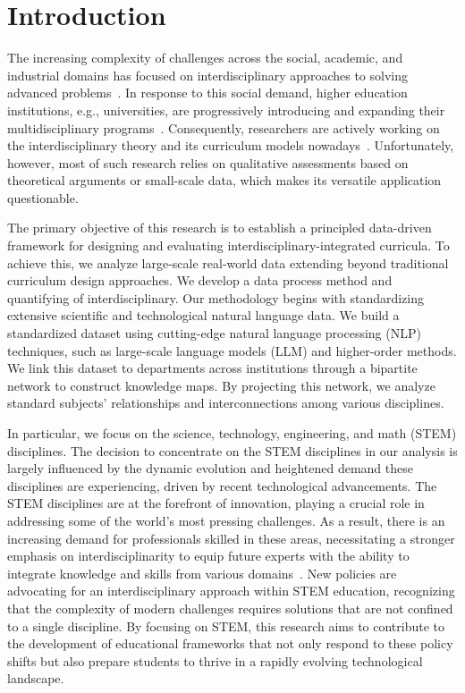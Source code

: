 \documentclass{bmcart}
\begin{document}
\section{Introduction}
\label{sec:intro}

The increasing complexity of challenges across the social, academic, and industrial domains has focused on interdisciplinary approaches to solving advanced problems~\cite{Ledford2015}. In response to this social demand, higher education institutions, e.g., universities, are progressively introducing and expanding their multidisciplinary programs~\cite{Tsao2024, Newell1998, Klein2006, Ashby2019}. Consequently, researchers are actively working on the interdisciplinary theory and its curriculum models nowadays~\cite{Tsao2024, Penprase2020}. Unfortunately, however, most of such research relies on qualitative assessments based on theoretical arguments or small-scale data, which makes its versatile application questionable.

The primary objective of this research is to establish a principled data-driven framework for designing and evaluating interdisciplinary-integrated curricula. To achieve this, we analyze large-scale real-world data extending beyond traditional curriculum design approaches. We develop a data process method and quantifying of interdisciplinary. Our methodology begins with standardizing extensive scientific and technological natural language data. We build a standardized dataset using cutting-edge natural language processing (NLP) techniques, such as large-scale language models (LLM) and higher-order methods. We link this dataset to departments across institutions through a bipartite network to construct knowledge maps. By projecting this network, we analyze standard subjects' relationships and interconnections among various disciplines. 

In particular, we focus on the science, technology, engineering, and math (STEM) disciplines. The decision to concentrate on the STEM disciplines in our analysis is largely influenced by the dynamic evolution and heightened demand these disciplines are experiencing, driven by recent technological advancements. The STEM disciplines are at the forefront of innovation, playing a crucial role in addressing some of the world's most pressing challenges. As a result, there is an increasing demand for professionals skilled in these areas, necessitating a stronger emphasis on interdisciplinarity to equip future experts with the ability to integrate knowledge and skills from various domains~\cite{WashingtonPost}. New policies are advocating for an interdisciplinary approach within STEM education, recognizing that the complexity of modern challenges requires solutions that are not confined to a single discipline. By focusing on STEM, this research aims to contribute to the development of educational frameworks that not only respond to these policy shifts but also prepare students to thrive in a rapidly evolving technological landscape.
\end{document}
